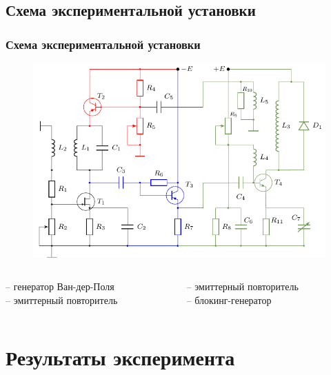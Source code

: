 \subsection{Схема экспериментальной установки}
\begin{frame}[t]%
	\frametitle{Схема экспериментальной установки}
	\vspace{-1em}
	\begin{figure}[h]
		\includegraphics[width=0.86\linewidth]{img/img_6}
	\end{figure}
	\vspace{-0.5em}
	\begin{columns}
		\begin{column}{0.49\textwidth}%
			 -- генератор Ван-дер-Поля\\
			 -- эмиттерный повторитель
		\end{column}
		\begin{column}{0.49\textwidth}%
			 -- эмиттерный повторитель\\
			 -- блокинг-генератор
		\end{column}
	\end{columns}		
\end{frame}
\section{Результаты эксперимента}
